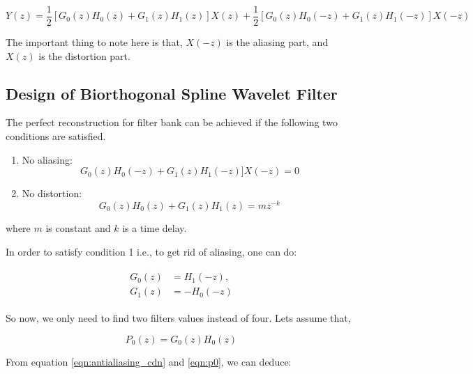 \begin{equation} \label{eqn_wavelet_transform}
{Y(z) = \frac{1}{2}[G_{0}(z)H_{0}(z) + G_{1}(z)H_{1}(z)]X(z) + \frac{1}{2}[G_{0}(z)H_{0}(-z) + G_{1}(z)H_{1}(-z)]X(-z)}
\end{equation}

The important thing to note here is that, $X(-z)$ is the aliasing part, and $X(z)$ is the distortion part.


\subsection{Design of Biorthogonal Spline Wavelet Filter}

The perfect reconstruction for filter bank can be achieved if the following two conditions are satisfied.

 \begin{enumerate}
	\item No aliasing: 
	\begin{equation} 
	{G_{0}(z)H_{0}(-z) + G_{1}(z)H_{1}(-z)]X(-z) = 0}
	\end{equation}
	\item No distortion:
	\begin{equation} 
	{G_{0}(z)H_{0}(z) + G_{1}(z)H_{1}(z) = mz^{-k}}
	\end{equation}
\end{enumerate}


where $m$ is constant and $k$ is a time delay.

In order to satisfy condition 1 i.e., to get rid of aliasing, one can do:

\begin{align}
\label{eqn:antialiasing_cdn}
\begin{split}
	G_0(z) &=  H_1(-z), \\ 
	G_1(z) &=  -H_0(-z)
\end{split}
\end{align}


So now, we only need to find two filters values instead of four. Lets assume that,

\begin{equation}\label{eqn:p0} 
{P_0(z)=G_{0}(z)H_{0}(z)}
\end{equation}

From equation \ref{eqn:antialiasing_cdn} and \ref{eqn:p0}, we can deduce:

